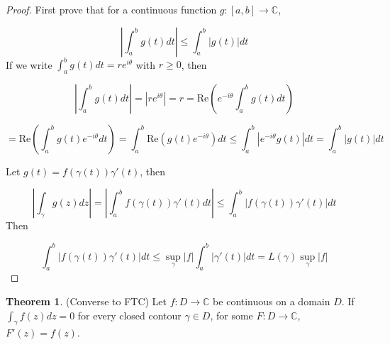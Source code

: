 \documentclass[12pt,a4paper]{article}
\theoremstyle{definition}
\newtheorem{theorem}[definition]{Theorem}
\begin{document}
\begin{proof}
	First prove that for a continuous function $g: [a, b] \rightarrow \mathbb{C}$,

	\[ \left | \int_a^b g(t) dt \right | \le \int_a^b |g(t)| dt \]
	If we write $\int_a^b g(t) dt = r e^{i \theta}$ with $r \ge 0$, then

	\[ \left | \int_a^b g(t) dt \right | = |r e^{i \theta}| = r = \text{Re} \left( e^{-i \theta} \int_a^b g(t) dt \right ) \]

	\[ = \text{Re}\left( \int_a^b g(t) e^{-i \theta} dt \right) = \int_a^b \text{Re}( g(t) e^{-i \theta}) dt \le \int_a^b \left |e^{-i \theta} g(t) \right | dt = \int_a^b |g(t)| dt \]

	Let $g(t) = f(\gamma(t)) \gamma'(t)$, then

	\[ \left | \int_{\gamma} g(z) dz \right | = \left | \int_a^b f(\gamma(t)) \gamma'(t) dt \right | \le \int_a^b \left | f(\gamma(t)) \gamma'(t) \right | dt \]
	Then

	\[ \int_a^b \left | f(\gamma(t)) \gamma'(t) \right | dt \le \sup_{\gamma} |f| \int_a^b |\gamma'(t)| dt = L(\gamma) \sup_{\gamma} |f| \]
\end{proof}

\begin{theorem}
	(Converse to FTC) Let $f: D \rightarrow \mathbb{C}$ be continuous on a domain $D$. If $\int_{\gamma} f(z) dz = 0$ for every closed contour $\gamma \in D$, for some $F: D \rightarrow \mathbb{C}$, $F'(z) = f(z)$.
\end{theorem}
\end{document}
